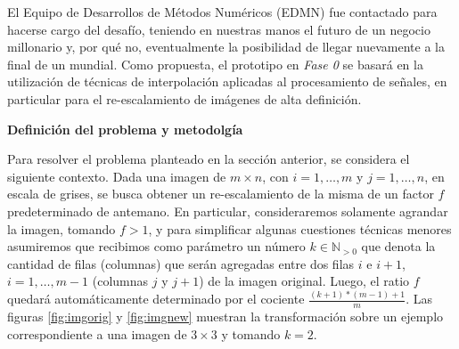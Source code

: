 \documentclass[a4paper]{article}
\newcounter{col}
\begin{document}
El Equipo de Desarrollos de M\'etodos Num\'ericos (EDMN) fue contactado para hacerse cargo del desaf\'io, teniendo en nuestras manos el futuro de un negocio millonario y, por qu\'e no, eventualmente la posibilidad de llegar nuevamente a la final de un mundial. Como propuesta, el prototipo en \emph{Fase 0} se basar\'a en la utilizaci\'on de t\'ecnicas de interpolaci\'on aplicadas al procesamiento de se\~nales, en particular para el re-escalamiento de im\'agenes de alta definici\'on.\\

\vskip 5pt

{\bf\noindent Definici\'on del problema y metodolg\'ia}

Para resolver el problema planteado en la secci\'on anterior, se considera el siguiente contexto. Dada una imagen de $m \times n$, con  $i = 1,\dots,m$ y $j = 1,\dots,n$, en escala de grises, se busca obtener un re-escalamiento de la misma de un factor $f$ predeterminado de antemano. En particular, consideraremos solamente agrandar la imagen, tomando $f > 1$, y para simplificar algunas cuestiones t\'ecnicas menores asumiremos que recibimos como par\'ametro un n\'umero $k \in \mathbb{N}_{>0}$ que denota la cantidad de filas (columnas) que ser\'an agregadas entre dos filas $i$ e $i+1$, $i = 1,\dots,m-1$ (columnas $j$ y $j+1$) de la imagen original. Luego, el ratio $f$ quedar\'a autom\'aticamente determinado por el cociente $\frac{(k+1)*(m-1) + 1}{m}$. Las figuras \ref{fig:imgorig} y \ref{fig:imgnew} muestran la transformaci\'on sobre un ejemplo correspondiente a una imagen de $3 \times 3$ y tomando $k = 2$.
\end{document}
